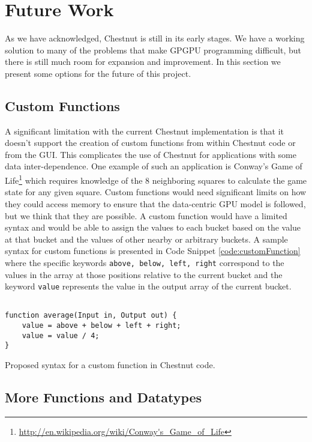 \documentclass[twocolumn]{article}
\renewcommand{\|}{\origbar} %
\newcommand{\code}[1]{\texttt{#1}}
\begin{document}
\section{Future Work}
\label{sec:future}

As we have acknowledged, Chestnut is still in its early stages. We have a working solution to many of the problems that make GPGPU programming difficult, but there is still much room for expansion and improvement. In this section we present some options for the future of this project.

\subsection{Custom Functions}

A significant limitation with the current Chestnut implementation is that it doesn't support the creation of custom functions from within Chestnut code or from the GUI. This complicates the use of Chestnut for applications with some data inter-dependence. One example of such an application is Conway's Game of Life\footnote{\url{http://en.wikipedia.org/wiki/Conway's_Game_of_Life}} which requires knowledge of the 8 neighboring squares to calculate the game state for any given square. Custom functions would need significant limits on how they could access memory to ensure that the data-centric GPU model is followed, but we think that they are possible. A custom function would have a limited syntax and would be able to assign the values to each bucket based on the value at that bucket and the values of other nearby or arbitrary buckets. A sample syntax for custom functions is presented in Code Snippet \ref{code:customFunction} where the specific keywords \code{above, below, left, right} correspond to the values in the array at those positions relative to the current bucket and the keyword \code{value} represents the value in the output array of the current bucket.

\begin{Code Snippet}
\begin{verbatim}

function average(Input in, Output out) {
    value = above + below + left + right;
    value = value / 4;
}
\end{verbatim}
\caption{Proposed syntax for a custom function in Chestnut code.}
\label{code:customFunction}
\end{Code Snippet}


\subsection{More Functions and Datatypes}
\end{document}
